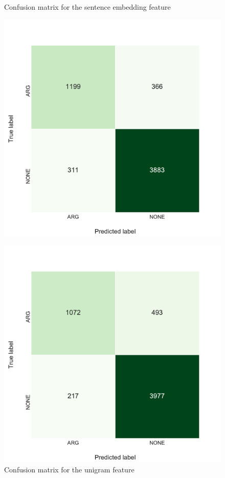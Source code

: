 \begin{figure}[h]
    \begin{minipage}{.5\linewidth}
   \caption{Confusion matrix for the sentence embedding feature} 
    \label{fig:2_conf_inf}
 \centering
	\includegraphics[width=1\textwidth]{images/experiments/conf-InferSent_True}
  \end{minipage} \hfill
    \begin{minipage}{.5\linewidth}
  
     \caption{Confusion matrix for the unigram feature} 
       \label{fig:2_conf_uni}
 \centering
	\includegraphics[width=1\textwidth]{images/experiments/conf-Unigrams_True}
    \end{minipage} 
\end{figure}


